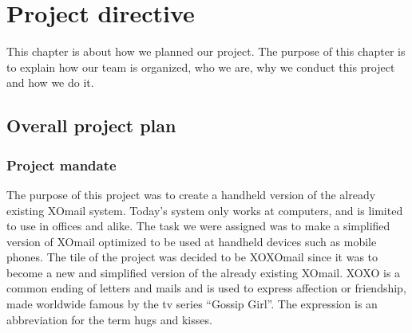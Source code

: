 \chapter{Project directive}

This chapter is about how we planned our project. The purpose of this chapter is to explain how our team is organized, who we are, why we conduct this project and how we do it.

\section{Overall project plan}

\subsection{Project mandate}
The purpose of this project was to create a handheld version of the already existing XOmail system. Today’s system only works at computers, and is limited to use in offices and alike. The task we were assigned was to make a simplified version of XOmail optimized to be used at handheld devices such as mobile phones.
\newline
\newline
The tile of the project was decided to be XOXOmail since it was to become a new and simplified version of the already existing XOmail. XOXO is a common ending of letters and mails and is used to express affection or friendship, made worldwide famous by the tv series “Gossip Girl”. The expression is an abbreviation for the term hugs and kisses.

